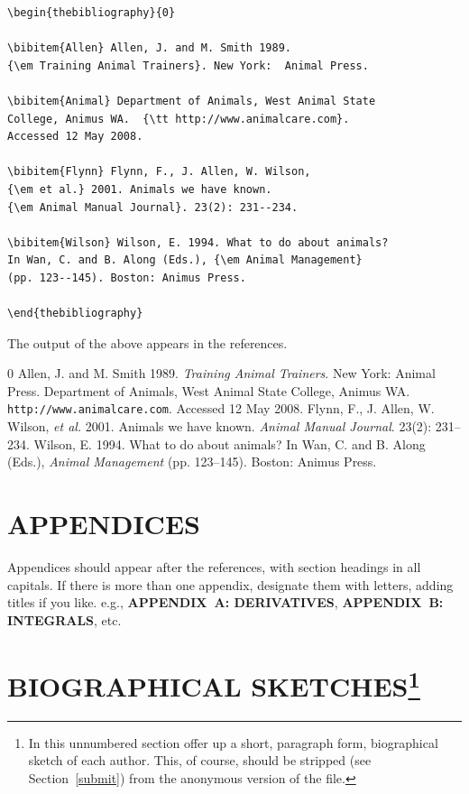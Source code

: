 \documentclass{primus}
\begin{document}
\begin{verbatim}
\begin{thebibliography}{0}

\bibitem{Allen} Allen, J. and M. Smith 1989. 
{\em Training Animal Trainers}. New York:  Animal Press.

\bibitem{Animal} Department of Animals, West Animal State 
College, Animus WA.  {\tt http://www.animalcare.com}. 
Accessed 12 May 2008. 

\bibitem{Flynn} Flynn, F., J. Allen, W. Wilson, 
{\em et al.} 2001. Animals we have known. 
{\em Animal Manual Journal}. 23(2): 231--234.

\bibitem{Wilson} Wilson, E. 1994. What to do about animals? 
In Wan, C. and B. Along (Eds.), {\em Animal Management} 
(pp. 123--145). Boston: Animus Press.

\end{thebibliography}
\end{verbatim}

The output of the above appears in the references.



\begin{thebibliography}{0}
 Allen, J. and M. Smith 1989. {\em Training Animal Trainers}. New York:  Animal Press.
 Department of Animals, West Animal State College, Animus WA.  {\tt http://www.animalcare.com}. Accessed 12 May 2008. 
 Flynn, F., J. Allen, W. Wilson, {\em et al.} 2001. Animals we have known. {\em Animal Manual Journal}. 23(2): 231--234.
 Wilson, E. 1994. What to do about animals? In Wan, C. and B. Along (Eds.), {\em Animal Management} (pp. 123--145). Boston: Animus Press.
\end{thebibliography}


\section*{APPENDICES}

Appendices should appear after the references, with section headings in all capitals. If there is more than one appendix, designate them with letters, adding titles if you like. e.g., {\bf APPENDIX~A: DERIVATIVES}, {\bf APPENDIX~B: INTEGRALS}, etc.


\section*{BIOGRAPHICAL SKETCHES\footnote{In this unnumbered section offer up a short, paragraph form, biographical sketch of each author. This, of course, should be stripped (see Section~\ref{submit}) from the anonymous version of the file.}}
\end{document}
